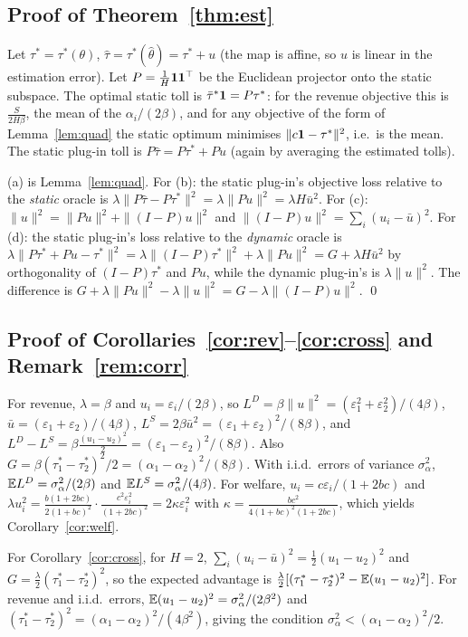 \subsection{Proof of Theorem~\ref{thm:est}}
Let $\tau^*=\tau^*(\theta)$, $\hat\tau=\tau^*(\hat\theta)=\tau^*+u$ (the map is affine, so $u$ is linear in the estimation error). Let $P=\frac1H\mathbf{1}\mathbf{1}^\top$ be the Euclidean projector onto the static subspace. The optimal static toll is $\bar\tau^*\mathbf{1}=P\tau^*$: for the revenue objective this is $\frac{S}{2H\beta}$, the mean of the $\alpha_i/(2\beta)$, and for any objective of the form of Lemma~\ref{lem:quad} the static optimum minimises $\|c\mathbf{1}-\tau^*\|^2$, i.e.\ is the mean. The static plug-in toll is $P\hat\tau=P\tau^*+Pu$ (again by averaging the estimated tolls).

(a) is Lemma~\ref{lem:quad}. For (b): the static plug-in's objective loss relative to the \emph{static} oracle is $\lambda\|P\hat\tau-P\tau^*\|^2=\lambda\|Pu\|^2=\lambda H\bar u^2$. For (c): $\|u\|^2=\|Pu\|^2+\|(I-P)u\|^2$ and $\|(I-P)u\|^2=\sum_i(u_i-\bar u)^2$. For (d): the static plug-in's loss relative to the \emph{dynamic} oracle is $\lambda\|P\tau^*+Pu-\tau^*\|^2=\lambda\|(I-P)\tau^*\|^2+\lambda\|Pu\|^2=G+\lambda H\bar u^2$ by orthogonality of $(I-P)\tau^*$ and $Pu$, while the dynamic plug-in's is $\lambda\|u\|^2$. The difference is $G+\lambda\|Pu\|^2-\lambda\|u\|^2=G-\lambda\|(I-P)u\|^2$. \qed

\subsection{Proof of Corollaries~\ref{cor:rev}--\ref{cor:cross} and Remark~\ref{rem:corr}}
For revenue, $\lambda=\beta$ and $u_i=\varepsilon_i/(2\beta)$, so $L^D=\beta\|u\|^2=(\varepsilon_1^2+\varepsilon_2^2)/(4\beta)$, $\bar u=(\varepsilon_1+\varepsilon_2)/(4\beta)$, $L^S=2\beta\bar u^2=(\varepsilon_1+\varepsilon_2)^2/(8\beta)$, and $L^D-L^S=\beta\frac{(u_1-u_2)^2}{2}=(\varepsilon_1-\varepsilon_2)^2/(8\beta)$. Also $G=\beta(\tau_1^*-\tau_2^*)^2/2=(\alpha_1-\alpha_2)^2/(8\beta)$. With i.i.d.\ errors of variance $\sigma_\alpha^2$, $\mathbb{E} L^D=\sigma_\alpha^2/(2\beta)$ and $\mathbb{E} L^S=\sigma_\alpha^2/(4\beta)$. For welfare, $u_i=c\varepsilon_i/(1+2bc)$ and $\lambda u_i^2=\frac{b(1+2bc)}{2(1+bc)^2}\cdot\frac{c^2\varepsilon_i^2}{(1+2bc)^2}=2\kappa\varepsilon_i^2$ with $\kappa=\frac{bc^2}{4(1+bc)^2(1+2bc)}$, which yields Corollary~\ref{cor:welf}.

For Corollary~\ref{cor:cross}, for $H=2$, $\sum_i(u_i-\bar u)^2=\frac12(u_1-u_2)^2$ and $G=\frac\lambda2(\tau_1^*-\tau_2^*)^2$, so the expected advantage is $\frac\lambda2[(\tau_1^*-\tau_2^*)^2-\mathbb{E}(u_1-u_2)^2]$. For revenue and i.i.d.\ errors, $\mathbb{E}(u_1-u_2)^2=\sigma_\alpha^2/(2\beta^2)$ and $(\tau_1^*-\tau_2^*)^2=(\alpha_1-\alpha_2)^2/(4\beta^2)$, giving the condition $\sigma_\alpha^2<(\alpha_1-\alpha_2)^2/2$.

